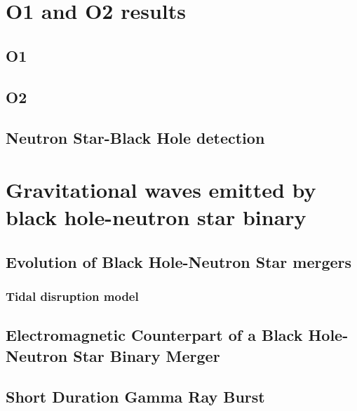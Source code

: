 \documentclass[binding=0.6cm, LaM]{sapthesis}
\begin{document}
\chapter{O1 and O2 results}

\section{O1}

\section{O2}

\section{Neutron Star-Black Hole detection}
\chapter{Gravitational waves emitted by black hole-neutron star binary}



\section{Evolution of Black Hole-Neutron Star mergers}



\subsection{Tidal disruption model}




\section{Electromagnetic Counterpart of a Black Hole-Neutron Star Binary Merger}



\section{Short Duration Gamma Ray Burst}
\end{document}
